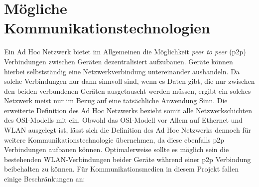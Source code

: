 \section{Mögliche Kommunikationstechnologien}
    Ein Ad Hoc Netzwerk bietet im Allgemeinen die Möglichkeit {\it peer to peer} (p2p) Verbindungen zwischen Geräten dezentralisiert aufzubauen.
    Geräte können hierbei selbstständig eine Netzwerkverbindung untereinander aushandeln. Da solche Verbindungen nur dann sinnvoll sind,
    wenn es Daten gibt, die nur zwischen den beiden verbundenen Geräten ausgetauscht werden müssen, ergibt ein solches Netzwerk meist nur
    im Bezug auf eine tatsächliche Anwendung Sinn. Die erweiterte Definition des Ad Hoc Netzwerks
    bezieht somit alle Netzwerkschichten des OSI-Modells mit ein.\cite[S.23]{AI-Sikora}
    Obwohl das OSI-Modell vor Allem auf Ethernet und WLAN ausgelegt ist, lässt sich die Definition des Ad Hoc Netzwerks
    dennoch für weitere Kommunikationstechnologie übernehmen, da diese ebenfalls p2p Verbindungen aufbauen können.
    Optimalerweise sollte es möglich sein die bestehenden WLAN-Verbindungen beider Geräte während einer p2p Verbindung beibehalten zu können.
    Für Kommunikationsmedien in diesem Projekt fallen einige Beschränkungen an: 
